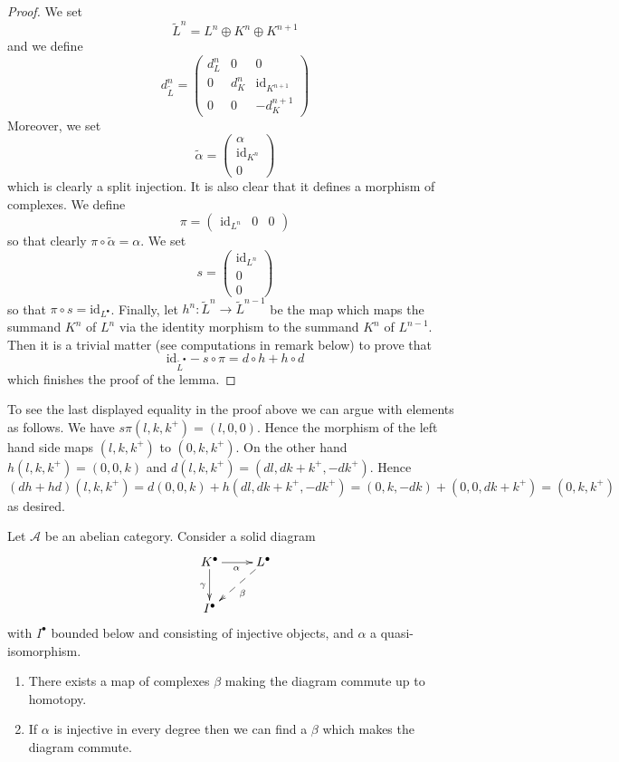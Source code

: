 \begin{proof}
We set
$$
\tilde L^n = L^n \oplus K^n \oplus K^{n + 1}
$$
and we define
$$
d^n_{\tilde L} =
\left(
\begin{matrix}
d^n_L & 0 & 0 \\
0 & d^n_K & \text{id}_{K^{n + 1}} \\
0 & 0 & -d^{n + 1}_K
\end{matrix}
\right)
$$
Moreover, we set
$$
\tilde \alpha =
\left(
\begin{matrix}
\alpha \\
\text{id}_{K^n} \\
0
\end{matrix}
\right)
$$
which is clearly a split injection. It is also clear that it defines a morphism
of complexes. We define
$$
\pi =
\left(
\begin{matrix}
\text{id}_{L^n} &
0 &
0
\end{matrix}
\right)
$$
so that clearly $\pi \circ \tilde \alpha = \alpha$. We set
$$
s =
\left(
\begin{matrix}
\text{id}_{L^n} \\
0 \\
0
\end{matrix}
\right)
$$
so that $\pi \circ s = \text{id}_{L^\bullet}$. Finally,
let $h^n : \tilde L^n \to \tilde L^{n - 1}$ be the map
which maps the summand $K^n$ of $L^n$ via the identity morphism
to the summand $K^n$ of $L^{n - 1}$. Then it is a trivial matter
(see computations in remark below) to prove that
$$
\text{id}_{\tilde L^\bullet} - s \circ \pi
=
d \circ h + h \circ d
$$
which finishes the proof of the lemma.
\end{proof}

\begin{remark}
\label{remark-compute-modules}
To see the last displayed equality in the proof above we can argue
with elements as follows. We have
$s\pi(l, k, k^{+}) = (l, 0, 0)$.
Hence the morphism of the left hand side maps
$(l, k, k^{+})$ to $(0, k, k^{+})$.
On the other hand $h(l, k, k^{+}) = (0, 0, k)$ and
$d(l, k, k^{+}) = (dl, dk + k^{+}, -dk^{+})$.
Hence $(dh + hd)(l, k, k^{+}) =
d(0, 0, k) + h(dl, dk + k^{+}, -dk^{+}) =
(0, k, -dk) + (0, 0, dk + k^{+}) = (0, k, k^{+})$
as desired.
\end{remark}

\begin{lemma}
\label{lemma-morphisms-lift}
Let $\mathcal{A}$ be an abelian category.
Consider a solid diagram
$$
\xymatrix{
K^\bullet \ar[r]_\alpha \ar[d]_\gamma & L^\bullet \ar@{-->}[dl]^\beta \\
I^\bullet
}
$$
with $I^\bullet$ bounded below and consisting of injective
objects, and $\alpha$ a quasi-isomorphism.
\begin{enumerate}
\item There exists a map of complexes $\beta$ making the diagram
commute up to homotopy.
\item If $\alpha$ is injective in every degree
then we can find a $\beta$ which makes the diagram commute.
\end{enumerate}
\end{lemma}

